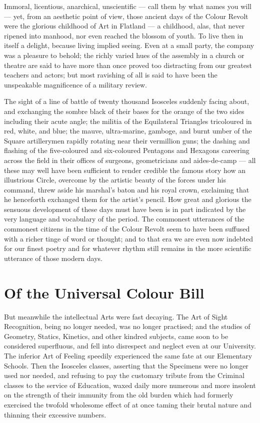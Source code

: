 \documentclass[10pt, kindle, oneside]{kindle}
\begin{document}
Immoral, licentious, anarchical, unscientific --- call them by what names you
will --- yet, from an aesthetic point of view, those ancient days of the Colour
Revolt were the glorious childhood of Art in Flatland --- a childhood, alas,
that never ripened into manhood, nor even reached the blossom of youth. To
live then in itself a delight, because living implied seeing. Even at a small
party, the company was a pleasure to behold; the richly varied hues of the
assembly in a church or theatre are said to have more than once proved too
distracting from our greatest teachers and actors; but most ravishing of all
is said to have been the unspeakable magnificence of a military review.

The sight of a line of battle of twenty thousand
Isosceles suddenly facing about, and exchanging the sombre black of their
bases for the orange of the two sides including their acute angle; the militia
of the Equilateral Triangles tricoloured in red, white, and blue; the mauve,
ultra-marine, gamboge, and burnt umber of the Square artillerymen rapidly
rotating near their vermillion guns; the dashing and flashing of the
five-coloured and six-coloured Pentagons and Hexagons careering across the
field in their offices of surgeons, geometricians and aides-de-camp --- all
these may well have been sufficient to render credible the famous story how an
illustrious Circle, overcome by the artistic beauty of the forces under his
command, threw aside his marshal's baton and his royal crown, exclaiming that
he henceforth exchanged them for the artist's pencil. How great and glorious
the sensuous development of these days must have been is in part indicated by
the very language and vocabulary of the period. The commonest utterances of
the commonest citizens in the time of the Colour Revolt seem to have been
suffused with a richer tinge of word or thought; and to that era we are even
now indebted for our finest poetry and for whatever rhythm still remains in
the more scientific utterance of those modern days.


\chapter{Of the Universal Colour Bill}


But meanwhile the intellectual Arts were fast decaying.
The Art of Sight Recognition, being no longer needed, was no longer practised;
and the studies of Geometry, Statics, Kinetics, and other kindred subjects,
came soon to be considered superfluous, and fell into disrespect and neglect
even at our University. The inferior Art of Feeling speedily experienced the
same fate at our Elementary Schools. Then the Isosceles classes, asserting
that the Specimens were no longer used nor needed, and refusing to pay the
customary tribute from the Criminal classes to the service of Education, waxed
daily more numerous and more insolent on the strength of their immunity from
the old burden which had formerly exercised the twofold wholesome effect of at
once taming their brutal nature and thinning their excessive numbers.
\end{document}
